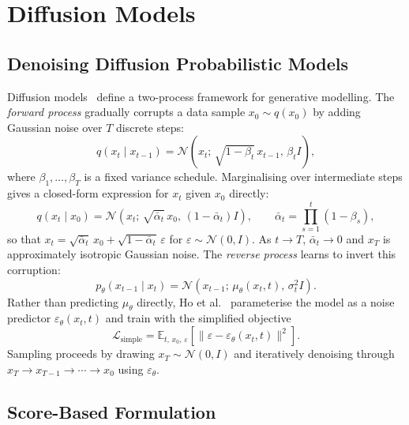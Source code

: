 
\section{Diffusion Models}
\label{sec:diffusion_models}

\subsection{Denoising Diffusion Probabilistic Models}

Diffusion models~\citep{pmlr-v37-sohl-dickstein15, Ho2020} define a two-process framework
for generative modelling. The \emph{forward process} gradually corrupts a data sample
$x_0 \sim q(x_0)$ by adding Gaussian noise over $T$ discrete steps:
\begin{equation}
    q(x_t \mid x_{t-1}) = \mathcal{N}\!\left(x_t;\,\sqrt{1-\beta_t}\,x_{t-1},\,\beta_t I\right),
\end{equation}
where $\beta_1, \ldots, \beta_T$ is a fixed variance schedule. Marginalising over
intermediate steps gives a closed-form expression for $x_t$ given $x_0$ directly:
\begin{equation}
    q(x_t \mid x_0) = \mathcal{N}\!\left(x_t;\,\sqrt{\bar\alpha_t}\,x_0,\,(1-\bar\alpha_t)I\right),
    \qquad \bar\alpha_t = \prod_{s=1}^t (1-\beta_s),
\end{equation}
so that $x_t = \sqrt{\bar\alpha_t}\,x_0 + \sqrt{1-\bar\alpha_t}\,\varepsilon$ for
$\varepsilon \sim \mathcal{N}(0,I)$. As $t \to T$, $\bar\alpha_t \to 0$ and $x_T$ is
approximately isotropic Gaussian noise. The \emph{reverse process} learns to invert this
corruption:
\begin{equation}
    p_\theta(x_{t-1} \mid x_t) = \mathcal{N}\!\left(x_{t-1};\,\mu_\theta(x_t, t),\,\sigma_t^2 I\right).
\end{equation}
Rather than predicting $\mu_\theta$ directly, Ho et al.~\citep{Ho2020} parameterise the
model as a noise predictor $\varepsilon_\theta(x_t, t)$ and train with the simplified
objective
\begin{equation}
    \mathcal{L}_{\mathrm{simple}} = \mathbb{E}_{t,\,x_0,\,\varepsilon}\!\left[
    \|\varepsilon - \varepsilon_\theta(x_t, t)\|^2\right].
\end{equation}
Sampling proceeds by drawing $x_T \sim \mathcal{N}(0,I)$ and iteratively denoising through
$x_T \to x_{T-1} \to \cdots \to x_0$ using $\varepsilon_\theta$.

\subsection{Score-Based Formulation}

